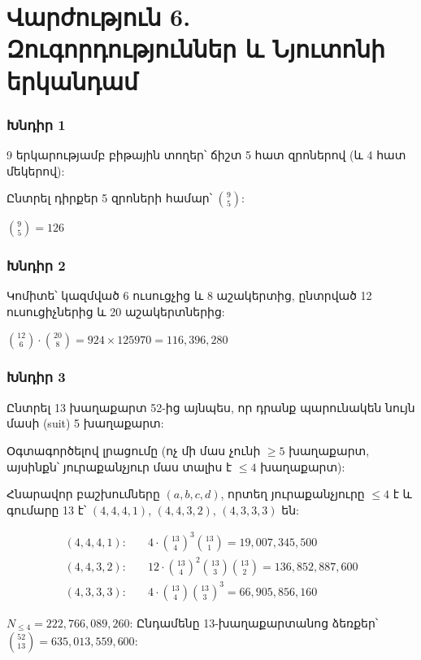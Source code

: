 
\section*{Վարժություն 6. Զուգորդություններ և Նյուտոնի երկանդամ}

\subsubsection*{Խնդիր 1}
9 երկարությամբ բիթային տողեր՝ ճիշտ 5 հատ զրոներով (և 4 հատ մեկերով):

Ընտրել դիրքեր 5 զրոների համար՝ $\binom{9}{5}$:

$\boxed{\binom{9}{5} = 126}$

\subsubsection*{Խնդիր 2}
Կոմիտե՝ կազմված 6 ուսուցչից և 8 աշակերտից, ընտրված 12 ուսուցիչներից և 20 աշակերտներից:

$\boxed{\binom{12}{6}\cdot\binom{20}{8} = 924 \times 125970 = 116{,}396{,}280}$

\subsubsection*{Խնդիր 3}
Ընտրել 13 խաղաքարտ 52-ից այնպես, որ դրանք պարունակեն նույն մասի (suit) 5 խաղաքարտ:

Օգտագործելով լրացումը (ոչ մի մաս չունի $\ge 5$ խաղաքարտ, այսինքն՝ յուրաքանչյուր մաս տալիս է $\le 4$ խաղաքարտ):

Հնարավոր բաշխումները $(a,b,c,d)$, որտեղ յուրաքանչյուրը $\le 4$ է և գումարը 13 է՝ $(4,4,4,1)$, $(4,4,3,2)$, $(4,3,3,3)$ են:

\begin{align*}
(4,4,4,1):&\quad 4\cdot\binom{13}{4}^3\binom{13}{1} = 19{,}007{,}345{,}500\\
(4,4,3,2):&\quad 12\cdot\binom{13}{4}^2\binom{13}{3}\binom{13}{2} = 136{,}852{,}887{,}600\\
(4,3,3,3):&\quad 4\cdot\binom{13}{4}\binom{13}{3}^3 = 66{,}905{,}856{,}160
\end{align*}

$N_{\le 4} = 222{,}766{,}089{,}260$:
Ընդամենը 13-խաղաքարտանոց ձեռքեր՝ $\binom{52}{13} = 635{,}013{,}559{,}600$:

